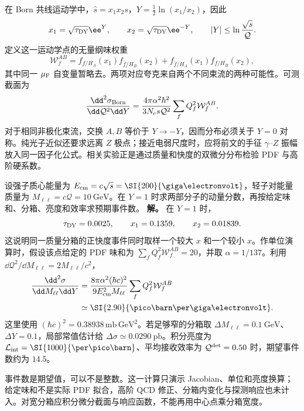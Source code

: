 在 Born 共线运动学中，$\hat s=x_1x_2s$，$Y=\frac12\ln(x_1/x_2)$，因此
\begin{equation}
 x_1=\sqrt{\tau_{\rm DY}}\ee^Y,\qquad
 x_2=\sqrt{\tau_{\rm DY}}\ee^{-Y},\qquad
 |Y|\leq\ln\frac{\sqrt s}{\mathcal Q}.
 \label{eq:dy-born-fractions}
\end{equation}
定义这一运动学点的无量纲味权重
\begin{equation*}
 \mathcal W_f^{AB}
 =f_{f/H_A}(x_1)f_{\bar f/H_B}(x_2)
 +f_{\bar f/H_A}(x_1)f_{f/H_B}(x_2),
\end{equation*}
其中同一 $\mu_{\rm F}$ 自变量暂略去。两项对应夸克来自两个不同束流的两种可能性。可测截面为
\begin{equation}
 \frac{\dd^2\sigma_{\rm Born}}{\dd\mathcal Q^2\dd Y}
 =\frac{4\pi\alpha^2\hbar^2}{3N_c s\mathcal Q^2}
 \sum_f Q_f^2\mathcal W_f^{AB}.
 \label{eq:dy-born-hadronic}
\end{equation}
对于相同非极化束流，交换 $A,B$ 等价于 $Y\to-Y$，因而分布必须关于 $Y=0$ 对称。纯光子近似还要求远离 $Z$ 极点；接近电弱尺度时，应将前文的手征 $\gamma$--$Z$ 振幅放入同一因子化公式。相关实验正是通过质量和快度的双微分分布检验 PDF 与高阶硬系数\cite{CMS2015DrellYan}。

\begin{exbox}
设强子质心能量为 $E_{\rm cm}=c\sqrt s=\SI{200}{\giga\electronvolt}$，轻子对能量质量为 $M_{\ell\ell}=c\mathcal Q=\SI{10}{\giga\electronvolt}$。在 $Y=1$ 时求两部分子的动量分数，再按给定味和、分箱、亮度和效率求预期事件数。
\textbf{解。} 在 $Y=1$ 时，
\begin{equation*}
 \tau_{\rm DY}=0.0025,\qquad x_1=0.1359,\qquad x_2=0.01839.
\end{equation*}
这说明同一质量分箱的正快度事件同时取样一个较大 $x$ 和一个较小 $x$。作单位演算时，假设该点给定的 PDF 味和为 $\sum_fQ_f^2\mathcal W_f^{AB}=20$，并取 $\alpha=1/137$。利用 $\dd\mathcal Q^2/\dd M_{\ell\ell}=2M_{\ell\ell}/c^2$，
\begin{align*}
 \frac{\dd^2\sigma}{\dd M_{\ell\ell}\dd Y}
 &=\frac{8\pi\alpha^2(\hbar c)^2}{9E_{\rm cm}^2M_{\ell\ell}}
 \sum_fQ_f^2\mathcal W_f^{AB}\\
 &\simeq\SI{2.90}{\pico\barn\per\giga\electronvolt}.
\end{align*}
这里使用 $(\hbar c)^2=0.38938\,\mathrm{mb\,GeV^2}$。若足够窄的分箱取 $\Delta M_{\ell\ell}=\SI{0.1}{\giga\electronvolt}$、$\Delta Y=0.1$，局部常值估计给 $\Delta\sigma\simeq\SI{0.0290}{\pico\barn}$。积分亮度为 $\mathcal L_{\rm int}=\SI{1000}{\per\pico\barn}$、平均接收效率为 $\mathcal Q^{\rm det}=0.50$ 时，期望事件数约为 $14.5$。

事件数是期望值，可以不是整数。这一计算只演示 Jacobian、单位和亮度换算；给定味和不是实际 PDF 拟合，高阶 QCD 修正、分箱内变化与探测响应也未计入。对宽分箱应积分微分截面与响应函数，不能再用中心点乘分箱宽度。
\end{exbox}

